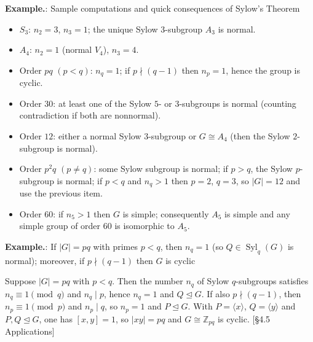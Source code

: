 \documentclass[12pt]{article}
\theoremstyle{definition}
\newcommand{\Syl}{\operatorname{Syl}}
\begin{document}

\noindent\textbf{Example.}: Sample computations and quick consequences of Sylow’s Theorem

\newpage

\begin{itemize}
  \item $S_3$: $n_2=3$, $n_3=1$; the unique Sylow $3$-subgroup $A_3$ is normal.\\
  \item $A_4$: $n_2=1$ (normal $V_4$), $n_3=4$.\\
  \item Order $pq$ $(p<q)$: $n_q=1$; if $p\nmid(q-1)$ then $n_p=1$, hence the group is cyclic.\\
  \item Order $30$: at least one of the Sylow $5$- or $3$-subgroups is normal (counting contradiction if both are nonnormal).\\
  \item Order $12$: either a normal Sylow $3$-subgroup or $G\cong A_4$ (then the Sylow $2$-subgroup is normal).\\
  \item Order $p^2q$ $(p\ne q)$: some Sylow subgroup is normal; if $p>q$, the Sylow $p$-subgroup is normal; if $p<q$ and $n_q>1$ then $p=2$, $q=3$, so $|G|=12$ and use the previous item.\\
  \item Order $60$: if $n_5>1$ then $G$ is simple; consequently $A_5$ is simple and any simple group of order $60$ is isomorphic to $A_5$.\\
\end{itemize}


\newpage


\noindent\textbf{Example.}: If $|G|=pq$ with primes $p<q$, then $n_q=1$ (so $Q\in\Syl_q(G)$ is normal); moreover, if $p\nmid (q-1)$ then $G$ is cyclic

\newpage

Suppose $|G|=pq$ with $p<q$. Then the number $n_q$ of Sylow $q$-subgroups satisfies $n_q\equiv 1\pmod q$ and $n_q\mid p$, hence $n_q=1$ and $Q\trianglelefteq G$. If also $p\nmid(q-1)$, then $n_p\equiv 1\pmod p$ and $n_p\mid q$, so $n_p=1$ and $P\trianglelefteq G$. With $P=\langle x\rangle$, $Q=\langle y\rangle$ and $P,Q\trianglelefteq G$, one has $[x,y]=1$, so $|xy|=pq$ and $G\cong \mathbb{Z}_{pq}$ is cyclic. \hfill {\footnotesize [§4.5 Applications]}\\
\end{document}
